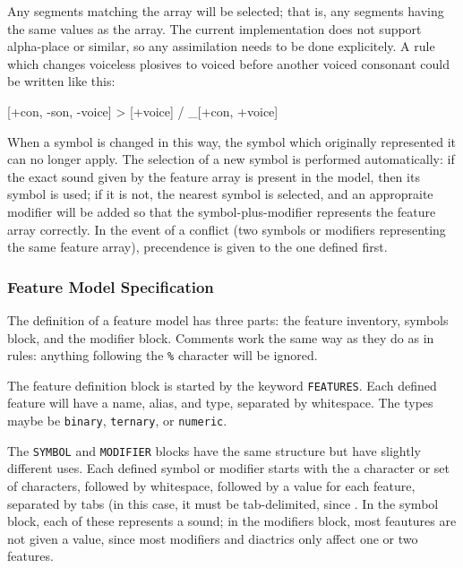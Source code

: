\documentclass[10pt,letterpaper]{article}
\newcounter{excounter}
\newenvironment{vex}[1]{
	\vspace{1em}
	\refstepcounter{excounter}
	\noindent\makebox[3em][l]{(\arabic{excounter}\label{#1})}
	\minipage{\textwidth}
	\verbatim
}{
	\endverbatim
	\endminipage
	\vspace{1em}
}
\begin{document}
\noindent
Any segments matching the array will be selected; that is, any segments having the same values as the array. The current implementation does not support alpha-place or similar, so any assimilation needs to be done explicitely. A rule which changes voiceless plosives to voiced before another voiced consonant could be written like this:

\begin{vex}{ex:voicing_assimilation}
[+con, -son, -voice] > [+voice] / _[+con, +voice]
\end{vex}

When a symbol is changed in this way, the symbol which originally represented it can no longer apply. The selection of a new symbol is performed automatically: if the exact sound given by the feature array is present in the model, then its symbol is used; if it is not, the nearest symbol is selected, and an appropraite modifier will be added so that the symbol-plus-modifier represents the feature array correctly. In the event of a conflict (two symbols or modifiers representing the same feature array), precendence is given to the one defined first.

\subsubsection{Feature Model Specification}
\label{ssub:feature_model_specification}
The definition of a feature model has three parts: the feature inventory, symbols block, and the modifier block. Comments work the same way as they do as in rules: anything following the \texttt{\%} character will be ignored.

The feature definition block is started by the keyword \texttt{FEATURES}. Each defined feature will have a name, alias, and type, separated by whitespace. The types maybe be \texttt{binary}, \texttt{ternary}, or \texttt{numeric}. 


The \texttt{SYMBOL} and \texttt{MODIFIER} blocks have the same structure but have slightly different uses. Each defined symbol or modifier starts with the a character or set of characters, followed by whitespace, followed by a value for each feature, separated by tabs (in this case, it must be tab-delimited, since . In the symbol block, each of these represents a sound; in the modifiers block, most feautures are not given a value, since most modifiers and diactrics only affect one or two features.
\end{document}
